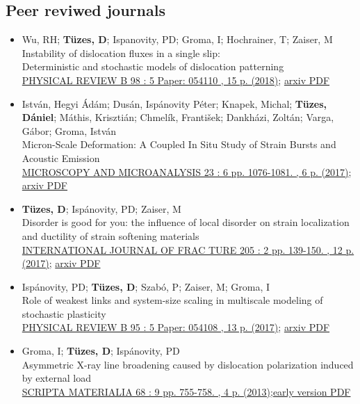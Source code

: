 \documentclass[11pt,a4paper,sans]{moderncv}        %
\begin{document}
\subsection{Peer reviwed journals}
\begin{itemize}
\item Wu, RH; \textbf{Tüzes, D}; Ispanovity, PD; Groma, I; Hochrainer, T; Zaiser, M\\
	Instability of dislocation fluxes in a single slip:\\
	Deterministic and stochastic models of dislocation patterning\\
    \href{https://journals.aps.org/prb/abstract/10.1103/PhysRevB.98.054110}{PHYSICAL REVIEW B 98 : 5 Paper: 054110 , 15 p. (2018)};
    \href{https://arxiv.org/pdf/1708.05533}{arxiv PDF}
\item István, Hegyi Ádám; Dusán, Ispánovity Péter; Knapek, Michal; \textbf{Tüzes, Dániel}; Máthis, Krisztián; Chmelík, František; Dankházi, Zoltán; Varga, Gábor; Groma, István\\
    Micron-Scale Deformation: A Coupled In Situ Study of Strain Bursts and Acoustic Emission\\
    \href{https://www.cambridge.org/core/journals/microscopy-and-microanalysis/article/micronscale-deformation-a-coupled-in-situ-study-of-strain-bursts-and-acoustic-emission/DAF84F7E4CC7C2A211E39A1FFBCCB2D0}{MICROSCOPY AND MICROANALYSIS 23 : 6 pp. 1076-1081. , 6 p. (2017)};
    \href{https://arxiv.org/pdf/1604.01815}{arxiv PDF}
\item \textbf{Tüzes, D}; Ispánovity, PD; Zaiser, M\\
    Disorder is good for you: the influence of local disorder on strain localization and ductility of strain softening materials\\
    \href{https://link.springer.com/article/10.1007\%2Fs10704-017-0187-1}{INTERNATIONAL JOURNAL OF FRAC	TURE 205 : 2 pp. 139-150. , 12 p. (2017)};
    \href{https://arxiv.org/pdf/1604.01821}{arxiv PDF}
\item Ispánovity, PD; \textbf{Tüzes, D}; Szabó, P; Zaiser, M; Groma, I\\
    Role of weakest links and system-size scaling in multiscale modeling of stochastic plasticity\\
    \href{https://journals.aps.org/prb/abstract/10.1103/PhysRevB.95.054108}{PHYSICAL REVIEW B 95 : 5 Paper: 054108 , 13 p. (2017)};
    \href{https://arxiv.org/pdf/1604.01645}{arxiv PDF}
\item Groma, I; \textbf{Tüzes, D}; Ispánovity, PD\\
    Asymmetric X-ray line broadening caused by dislocation polarization induced by external load\\
    \href{https://www.sciencedirect.com/science/article/pii/S1359646213000110}{SCRIPTA MATERIALIA 68 : 9 pp. 755-758. , 4 p. (2013)};\href{http://metal.elte.hu/~tuzes/docs/pre\%20AsymmetricX-ray\%20line\%20broadening\%20caused\%20by\%20dislocation\%20polarization\%20induced\%20by\%20external\%20load.pdf}{early version PDF}
\end{itemize}
    
\end{document}
